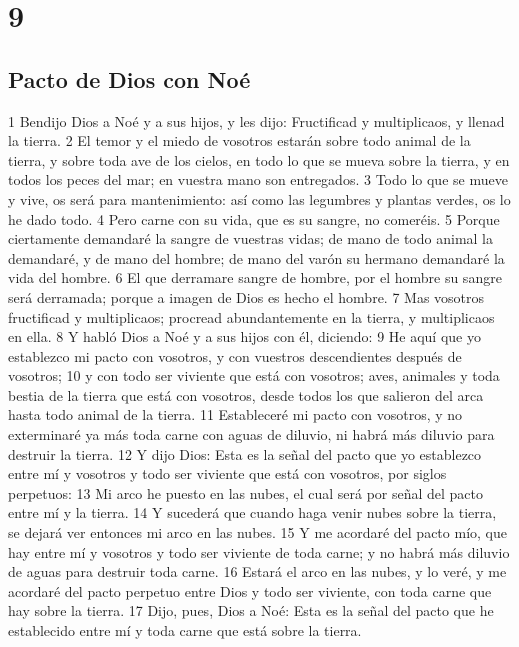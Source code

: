 \chapter{9}

\section{Pacto de Dios con Noé}

1 Bendijo Dios a Noé y a sus hijos, y les dijo: Fructificad y multiplicaos, y llenad la tierra.
2 El temor y el miedo de vosotros estarán sobre todo animal de la tierra, y sobre toda ave de los cielos, en todo lo que se mueva sobre la tierra, y en todos los peces del mar; en vuestra mano son entregados.
3 Todo lo que se mueve y vive, os será para mantenimiento: así como las legumbres y plantas verdes, os lo he dado todo.
4 Pero carne con su vida, que es su sangre, no comeréis.
5 Porque ciertamente demandaré la sangre de vuestras vidas; de mano de todo animal la demandaré, y de mano del hombre; de mano del varón su hermano demandaré la vida del hombre.
6 El que derramare sangre de hombre, por el hombre su sangre será derramada; porque a imagen de Dios es hecho el hombre.
7 Mas vosotros fructificad y multiplicaos; procread abundantemente en la tierra, y multiplicaos en ella.
8 Y habló Dios a Noé y a sus hijos con él, diciendo:
9 He aquí que yo establezco mi pacto con vosotros, y con vuestros descendientes después de vosotros;
10 y con todo ser viviente que está con vosotros; aves, animales y toda bestia de la tierra que está con vosotros, desde todos los que salieron del arca hasta todo animal de la tierra.
11 Estableceré mi pacto con vosotros, y no exterminaré ya más toda carne con aguas de diluvio, ni habrá más diluvio para destruir la tierra.
12 Y dijo Dios: Esta es la señal del pacto que yo establezco entre mí y vosotros y todo ser viviente que está con vosotros, por siglos perpetuos:
13 Mi arco he puesto en las nubes, el cual será por señal del pacto entre mí y la tierra.
14 Y sucederá que cuando haga venir nubes sobre la tierra, se dejará ver entonces mi arco en las nubes.
15 Y me acordaré del pacto mío, que hay entre mí y vosotros y todo ser viviente de toda carne; y no habrá más diluvio de aguas para destruir toda carne.
16 Estará el arco en las nubes, y lo veré, y me acordaré del pacto perpetuo entre Dios y todo ser viviente, con toda carne que hay sobre la tierra.
17 Dijo, pues, Dios a Noé: Esta es la señal del pacto que he establecido entre mí y toda carne que está sobre la tierra.

